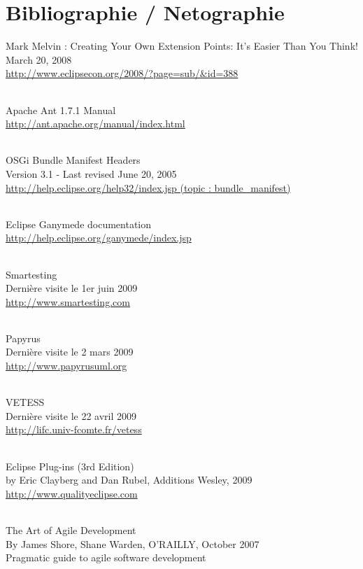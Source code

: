 \chapter*{Bibliographie / Netographie}

Mark Melvin : Creating Your Own Extension Points: It's Easier Than You Think! \\
March 20, 2008\\
\url{http://www.eclipsecon.org/2008/?page=sub/&id=388}

\subparagraph*{}
Apache Ant 1.7.1 Manual\\
\url{http://ant.apache.org/manual/index.html}

\subparagraph*{}
OSGi Bundle Manifest Headers\\
Version 3.1 - Last revised June 20, 2005\\
\href{http://help.eclipse.org/help32/index.jsp?topic=/org.eclipse.platform.doc.isv/reference/misc/bundle_manifest.html}{http://help.eclipse.org/help32/index.jsp (topic : bundle\_manifest)}

\subparagraph*{}
Eclipse Ganymede documentation\\
\url{http://help.eclipse.org/ganymede/index.jsp}

\subparagraph*{}
Smartesting\\
Dernière visite le 1er juin 2009\\
\url{http://www.smartesting.com}

\subparagraph*{}
Papyrus\\
Dernière visite le 2 mars 2009\\
\url{http://www.papyrusuml.org}

\subparagraph*{}
VETESS\\
Dernière visite le 22 avril 2009\\
\url{http://lifc.univ-fcomte.fr/vetess}

\subparagraph*{}
Eclipse Plug-ins (3rd Edition)\\
by Eric Clayberg and Dan Rubel, Additions Wesley, 2009\\
\url{http://www.qualityeclipse.com}

\subparagraph*{}
The Art of Agile Development \\
By James Shore, Shane Warden, O'RAILLY, October 2007\\
Pragmatic guide to agile software development